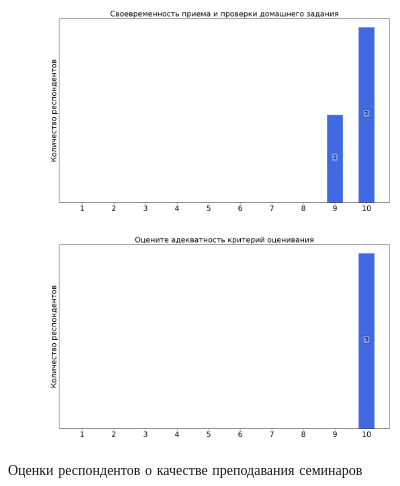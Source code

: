 \begin{figure}[H]
\begin{subfigure}[b]{0.45\textwidth}
                \includegraphics[width=\textwidth]{images/2 course/Аналитическая механика/seminarists-marks-Ахлумади Махди Реза-2.png}
            \end{subfigure}
            \begin{subfigure}[b]{0.45\textwidth}
                \centering
                \includegraphics[width=\textwidth]{images/2 course/Аналитическая механика/seminarists-marks-Ахлумади Махди Реза-3.png}
            \end{subfigure}	
            \caption{Оценки респондентов о качестве преподавания семинаров}
        \end{figure}


